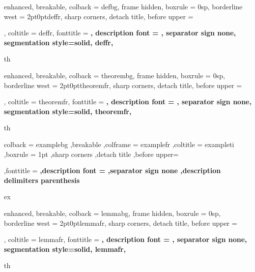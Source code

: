 \usepackage{array}

\newcommand\TODO{{\bfseries \color{red} \itshape \underline{Todo}}}


\usepackage{tikz}
\usepackage[most,many,breakable]{tcolorbox}

{%
	enhanced,
	breakable,
	colback = defbg,
	frame hidden,
	boxrule = 0sp,
	borderline west = {2pt}{0pt}{deffr},
	sharp corners,
	detach title,
	before upper = \tcbtitle\par\smallskip,
	coltitle = deffr,
	fonttitle = \bfseries\sffamily,
	description font = \mdseries,
	separator sign none,
	segmentation style={solid, deffr},
}
{th}


{%
	enhanced,
	breakable,
	colback = theorembg,
	frame hidden,
	boxrule = 0sp,
	borderline west = {2pt}{0pt}{theoremfr},
	sharp corners,
	detach title,
	before upper = \tcbtitle\par\smallskip,
	coltitle = theoremfr,
	fonttitle = \bfseries\sffamily,
	description font = \mdseries,
	separator sign none,
	segmentation style={solid, theoremfr},
}
{th}



{%
	colback = examplebg
	,breakable
	,colframe = examplefr
	,coltitle = exampleti
	,boxrule = 1pt
	,sharp corners
	,detach title
	,before upper=\tcbtitle\par\smallskip
	,fonttitle = \bfseries
	,description font = \mdseries
	,separator sign none
	,description delimiters parenthesis
}
{ex}




{%
	enhanced,
	breakable,
	colback = lemmabg,
	frame hidden,
	boxrule = 0sp,
	borderline west = {2pt}{0pt}{lemmafr},
	sharp corners,
	detach title,
	before upper = \tcbtitle\par\smallskip,
	coltitle = lemmafr,
	fonttitle = \bfseries\sffamily,
	description font = \mdseries,
	separator sign none,
	segmentation style={solid, lemmafr},
}
{th}
